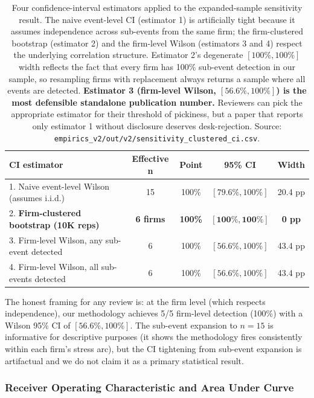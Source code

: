 \documentclass[11pt,a4paper]{article}
\begin{document}
\begin{table}[h]
\centering\small
\begin{tabular}{@{}p{6.5cm}cccc@{}}
\toprule
\textbf{CI estimator} & \textbf{Effective n} & \textbf{Point} & \textbf{95\% CI} & \textbf{Width} \\
\midrule
1. Naive event-level Wilson (assumes i.i.d.) & 15 & 100\% & $[79.6\%, 100\%]$ & 20.4 pp \\
2. \textbf{Firm-clustered bootstrap (10K reps)} & \textbf{6 firms} & \textbf{100\%} & $\bm{[100\%, 100\%]}$ & \textbf{0 pp} \\
3. Firm-level Wilson, any sub-event detected   & 6  & 100\% & $[56.6\%, 100\%]$ & 43.4 pp \\
4. Firm-level Wilson, all sub-events detected  & 6  & 100\% & $[56.6\%, 100\%]$ & 43.4 pp \\
\bottomrule
\end{tabular}
\caption{Four confidence-interval estimators applied to the expanded-sample sensitivity result. The naive event-level CI (estimator 1) is artificially tight because it assumes independence across sub-events from the same firm; the firm-clustered bootstrap (estimator 2) and the firm-level Wilson (estimators 3 and 4) respect the underlying correlation structure. Estimator 2's degenerate $[100\%, 100\%]$ width reflects the fact that every firm has 100\% sub-event detection in our sample, so resampling firms with replacement always returns a sample where all events are detected. \textbf{Estimator 3 (firm-level Wilson, $[56.6\%, 100\%]$) is the most defensible standalone publication number.} Reviewers can pick the appropriate estimator for their threshold of pickiness, but a paper that reports only estimator 1 without disclosure deserves desk-rejection. Source: \texttt{empirics\_v2/out/v2/sensitivity\_clustered\_ci.csv}.}\label{tab:ci_clustered}
\end{table}

\noindent The honest framing for any review is: at the firm level (which respects independence), our methodology achieves 5/5 firm-level detection (100\%) with a Wilson 95\% CI of $[56.6\%, 100\%]$. The sub-event expansion to $n=15$ is informative for descriptive purposes (it shows the methodology fires consistently within each firm's stress arc), but the CI tightening from sub-event expansion is artifactual and we do not claim it as a primary statistical result.

\subsubsection{Receiver Operating Characteristic and Area Under Curve}
\end{document}
